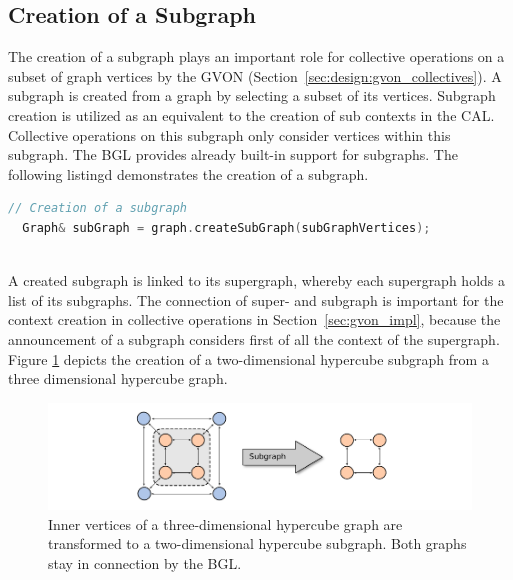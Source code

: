 \subsection{Creation of a Subgraph}
The creation of a subgraph plays an important role for collective
operations on a subset of graph vertices by the GVON
(Section~\ref{sec:design:gvon_collectives}). A subgraph is created
from a graph by selecting a subset of its vertices.  Subgraph creation is
utilized as an equivalent to the creation of sub contexts in the
CAL. Collective operations on this subgraph only consider vertices
within this subgraph. The BGL provides already built-in support for
subgraphs. The following listingd demonstrates the creation of a
subgraph.

\begin{lstlisting}[language=C++, label=lst:subgraph]
  // Creation of a subgraph
  Graph& subGraph = graph.createSubGraph(subGraphVertices);
  
\end{lstlisting}

\noindent A created subgraph is linked to its supergraph, whereby each
supergraph holds a list of its subgraphs. The connection of super- and
subgraph is important for the context creation in collective
operations in Section~\ref{sec:gvon_impl}, because the announcement of
a subgraph considers first of all the context of the
supergraph. Figure \ref{fig:subgraph_creation} depicts the creation of
a two-dimensional hypercube subgraph from a three dimensional
hypercube graph.

\begin{figure}[H]
  \centering
  \includegraphics[width=\textwidth]{graphics/40_subgraph_creation}
  \caption{Inner vertices of a three-dimensional hypercube graph are 
  transformed to a two-dimensional hypercube subgraph. Both graphs
  stay in connection by the BGL.}
  \label{fig:subgraph_creation}
\end{figure}

